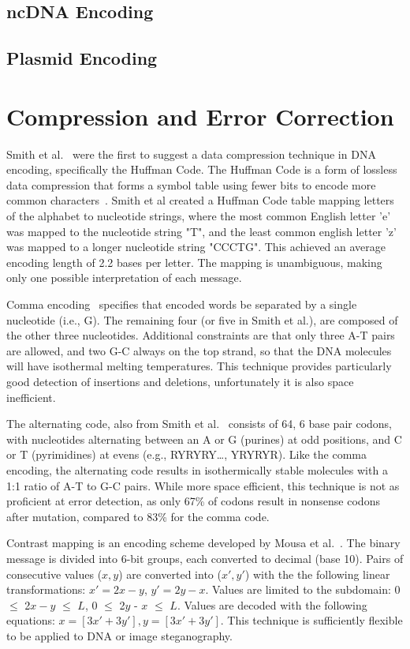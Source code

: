 \documentclass[USenglish,oneside,twocolumn]{article}
\begin{document}
\subsection{ncDNA Encoding}

\subsection{Plasmid Encoding}

\section{Compression and Error Correction}

Smith et al.~\cite{SFHC2003BL} were the first to suggest a data compression technique in DNA encoding, specifically the Huffman Code. The Huffman Code is a form of lossless data compression that forms a symbol table using fewer bits to encode more common characters~\cite{H1952POTIRE}. Smith et al created a Huffman Code table mapping letters of the alphabet to nucleotide strings, where the most common English letter 'e' was mapped to the nucleotide string "T", and the least common english letter 'z' was mapped to a longer nucleotide string "CCCTG". This achieved an average encoding length of 2.2 bases per letter. The mapping is unambiguous, making only one possible interpretation of each message.

Comma encoding~\cite{BVSPNAS2000} specifies that encoded words be separated by a single nucleotide (i.e., G). The remaining four (or five in Smith et al.), are composed of the other three nucleotides. Additional constraints are that only three A-T pairs are allowed, and two G-C always on the top strand, so that the DNA molecules will have isothermal melting temperatures. This technique provides particularly good detection of insertions and deletions, unfortunately it is also space inefficient.

The alternating code, also from Smith et al.~\cite{SFHC2003BL} consists of 64, 6 base pair codons, with nucleotides alternating between an A or G (purines) at odd positions, and C or T (pyrimidines) at evens (e.g., RYRYRY…, YRYRYR). Like the comma encoding, the alternating code results in isothermically stable molecules with a 1:1 ratio of A-T to G-C pairs. While more space efficient, this technique is not as proficient at error detection, as only 67\% of codons result in nonsense codons after mutation, compared to 83\% for the comma code.

Contrast mapping is an encoding scheme developed by Mousa et al.~\cite{MMAIAJI2011}. The binary message is divided into 6-bit groups, each converted to decimal (base 10). Pairs of consecutive values ($x, y$) are converted into ($x', y'$) with the the following linear transformations: $x' = 2x - y$,  $y' = 2y - x$. Values are limited to the subdomain:  0 $\leq$ 2$x - y$ $\leq$ $L$, 0 $\leq$ 2$y$ - $x$ $\leq$ $L$. Values are decoded with the following equations: $x = [3x' + 3y'], y = [3 x' + 3y']$. This technique is sufficiently flexible to be applied to DNA or image steganography.
\end{document}
